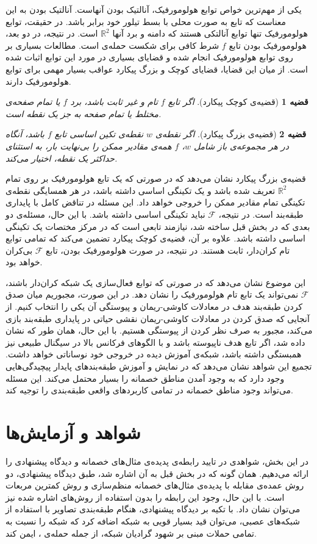 \documentclass[12pt,onecolumn,a4paper]{article}
\newtheorem{theorem}{قضیه}[section]
\begin{document}
یکی از مهم‌ترین خواص توابع هولومورفیک، آنالتیک بودن آنهاست. آنالتیک بودن به این معناست که تابع به صورت محلی با بسط تیلور خود برابر باشد. در حقیقت، توابع هولومورفیک تنها توابع آنالتکی هستند که دامنه و برد آنها $\mathbb{R}^2$ است. در نتیجه، در دو بعد، هولومورفیک بودن تابع $f$ شرط کافی برای شکست حمله‌ی  است. 
مطالعات بسیاری بر روی توابع هولومورفیک انجام شده و قضایای بسیاری در مورد این توابع اثبات شده است. از میان این قضایا، قضایای کوچک و بزرگ پیکارد عواقب بسیار مهمی برای توابع هولومورفیک دارند.
\begin{theorem}[قضیه‌ی کوچک پیکارد]
	اگر تابع $f$ تام و غیر ثابت باشد، برد $f$ یا تمام صفحه‌ی مختلط یا تمام صفحه به جز یک نقطه است.
\end{theorem}
\begin{theorem}[قضیه‌ی بزرگ پیکارد]
	اگر نقطه‌ی $w$ نقطه‌ی تکین اساسی تابع $f$ باشد، آنگاه در هر مجموعه‌ی باز شامل $w$، $f$ همه‌ی مقادیر ممکن را بی‌نهایت بار، به استثنای حداکثر یک نقطه، اختیار می‌کند.
\end{theorem}
قضیه‌ی بزرگ پیکارد نشان می‌دهد که در صورتی که یک تابع هولومورفیک بر روی تمام $\mathbb{R}^2$ تعریف شده باشد و یک تکینگی اساسی داشته باشد، در هر همسایگی نقطه‌ی تکینگی تمام مقادیر ممکن را خروجی خواهد داد. این مسئله در تناقض کامل با پایداری طبقه‌بند است. در نتیجه، $\mathcal{F}$ نباید تکینگی اساسی داشته باشد. با این حال،  مسئله‌ی دو بعدی که در بخش قبل ساخته شد، نیازمند تابعی است که در مرکز مختصات یک تکینگی اساسی داشته باشد. علاوه بر آن، قضیه‌ی کوچک پیکارد تضمین می‌کند که تمامی توابع تام کران‌دار، ثابت هستند. در نتیجه، در صورت هولومورفیک بودن، تابع $\mathcal{F}$ بی‌کران خواهد بود.

این موضوع نشان می‌دهد که در صورتی که توابع فعال‌سازی یک شبکه کران‌دار باشند، $\mathcal{F}$ نمی‌تواند یک تابع تام هولومورفیک را نشان دهد. در این صورت، مجبوریم میان صدق کردن طبقه‌بند هدف در معادلات کاوشی-ریمان و پیوستگی آن یکی را انتخاب کنیم. از آنجایی که صدق کردن در معادلات کاوشی-ریمان نقشی حیاتی در پایداری طبقه‌بند بازی می‌کند، مجبور به صرف نظر کردن از پیوستگی هستیم. با این حال، همان طور که نشان داده شد، اگر تابع هدف ناپیوسته باشد و با الگوهای فرکانس بالا در سیگنال طبیعی نیز همبستگی داشته باشد، شبکه‌ی آموزش دیده در خروجی خود نوساناتی خواهد داشت. تجمیع این شواهد نشان می‌دهد که در نمایش و آموزش طبقه‌بندهای پایدار پیچیدگی‌هایی وجود دارد که به وجود آمدن مناطق خصمانه را بسیار محتمل می‌کند. این مسئله می‌تواند وجود مناطق خصمانه در تمامی کاربردهای واقعی طبقه‌بندی را توجیه کند.


\section{شواهد و آزمایش‌ها}
در این بخش، شواهدی در تایید رابطه‌ی پدیده‌ی مثال‌های خصمانه و دیدگاه پیشنهادی را ارائه می‌دهیم. همان گونه که در بخش قبل به آن اشاره شد، طبق دیدگاه پیشنهادی، دو روش عمده‌ی مقابله با پدیده‌ی مثال‌های خصمانه منظم‌سازی و روش کمترین مربعات است. با این  حال، وجود این رابطه را بدون استفاده از روش‌های اشاره شده نیز می‌توان نشان داد. با تکیه بر دیدگاه پیشنهادی، هنگام طبقه‌بندی تصاویر با استفاده از شبکه‌های عصبی، می‌توان قید بسیار قویی به شبکه اضافه کرد که شبکه را نسبت به تمامی حملات مبنی بر شهود گرادیان  شبکه، از جمله حمله‌ی ، ایمن کند.
\end{document}
